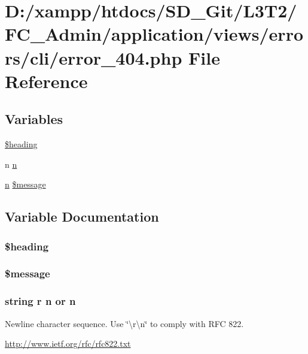 \hypertarget{cli_2error__404_8php}{}\section{D\+:/xampp/htdocs/\+S\+D\+\_\+\+Git/\+L3\+T2/\+F\+C\+\_\+\+Admin/application/views/errors/cli/error\+\_\+404.php File Reference}
\label{cli_2error__404_8php}
\subsection*{Variables}
\begin{DoxyCompactItemize}
\item 
\hyperlink{cli_2error__404_8php_a196169be7715d466e3310388b096598c}{\$heading}
\item 
n \hyperlink{cli_2error__404_8php_a958071ac50ebec838e917de66e151e7e}{n}
\item 
\hyperlink{cli_2error__general_8php_ace0fd03cd383f20ce6ea63247a207294}{n} \hyperlink{cli_2error__404_8php_aaba2b6aee423b3b5e46000f90b4c8c7f}{\$message}
\end{DoxyCompactItemize}


\subsection{Variable Documentation}
\hypertarget{cli_2error__404_8php_a196169be7715d466e3310388b096598c}{}
\subsubsection[{\$heading}]{\setlength{\rightskip}{0pt plus 5cm}\$heading}\label{cli_2error__404_8php_a196169be7715d466e3310388b096598c}
\hypertarget{cli_2error__404_8php_aaba2b6aee423b3b5e46000f90b4c8c7f}{}
\subsubsection[{\$message}]{ \$message}\label{cli_2error__404_8php_aaba2b6aee423b3b5e46000f90b4c8c7f}
\hypertarget{cli_2error__404_8php_a958071ac50ebec838e917de66e151e7e}{}
\subsubsection[{n}]{\setlength{\rightskip}{0pt plus 5cm}string {\bf r} n or n}\label{cli_2error__404_8php_a958071ac50ebec838e917de66e151e7e}
Newline character sequence. Use \char`\"{}\textbackslash{}r\textbackslash{}n\char`\"{} to comply with R\+F\+C 822.

\hyperlink{}{http\+://www.\+ietf.\+org/rfc/rfc822.\+txt}